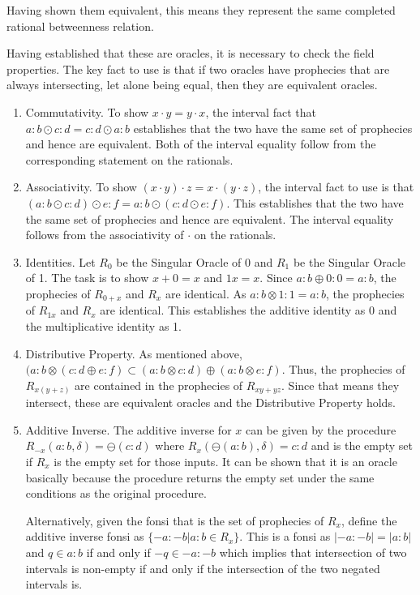 \documentclass[12pt]{article}
\begin{document}
Having shown them equivalent, this means they represent the same completed rational betweenness relation.

Having established that these are oracles, it is necessary to check the field properties. The key fact to use is that if two oracles have prophecies that are always intersecting, let alone being equal, then they are equivalent oracles. 

\begin{enumerate}
    \item Commutativity. To show $x\cdot y = y \cdot x$, the interval fact that $a:b \odot c:d = c:d \odot a:b$ establishes that the two have the same set of prophecies and hence are equivalent. Both of the interval equality follow from the corresponding statement on the rationals. 
    \item Associativity. To show $(x\cdot y) \cdot z = x \cdot (y \cdot z)$, the interval fact to use is that $(a:b \odot c:d) \odot e:f = a:b \odot (c:d \odot e:f)$. This establishes that the two have the same set  of prophecies and hence are equivalent. The interval equality follows from the associativity of $\cdot$ on the rationals. 
    \item Identities. Let $R_0$ be the Singular Oracle of 0 and $R_1$ be the Singular Oracle of 1. The task is to show $x+0=x$ and $1x  = x$.  Since $a:b \oplus 0:0 = a:b$, the prophecies of $R_{0+x}$ and $R_x$ are identical. As $a:b \otimes 1:1 = a:b$, the prophecies of $R_{1x}$ and $R_x$ are identical. This establishes the additive identity as 0 and the multiplicative identity as 1. 
    \item Distributive Property. As mentioned above, $( a:b \otimes ( c:d \oplus e:f) \subset (a:b \otimes c:d) \oplus (a:b \otimes e:f)$. Thus, the prophecies of $R_{x(y+z)}$ are contained in the prophecies of $R_{xy + yz}$. Since that means they intersect, these are equivalent oracles and the Distributive Property holds. 
    \item Additive Inverse.  The additive inverse for $x$ can be given by the procedure $R_{-x}(a:b, \delta) = \ominus (c:d)$ where $R_x (\ominus (a:b), \delta) = c:d$  and is the empty set if $R_x$ is the empty set for those inputs. It can be shown that it is an oracle basically because the procedure returns the empty set under the same conditions as the original procedure.

    Alternatively, given the fonsi that is the set of prophecies of $R_x$, define the additive inverse fonsi as $\{-a:-b| a:b \in R_x\}$. This is a fonsi as $|-a:-b| = |a:b|$ and  $q \in a:b$ if and only if $-q \in -a:-b$ which implies that intersection of two intervals is non-empty if and only if the intersection of the two negated intervals is. 


\end{enumerate}
\end{document}
